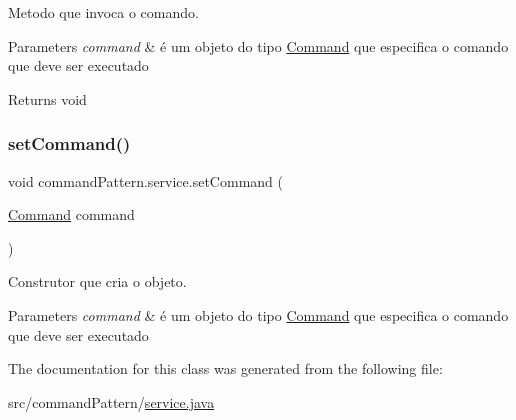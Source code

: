 Metodo que invoca o comando. 


\begin{DoxyParams}{Parameters}
{\em command} & é um objeto do tipo \mbox{\hyperlink{interfacecommand_pattern_1_1_command}{Command}} que especifica o comando que deve ser executado \\
\hline
\end{DoxyParams}
\begin{DoxyReturn}{Returns}
void 
\end{DoxyReturn}
\mbox{\label{classcommand_pattern_1_1service_a126704d575df711cb8abb7e03b7f0ce8}} 
\subsubsection{\texorpdfstring{setCommand()}{setCommand()}}
{\footnotesize\ttfamily void command\+Pattern.\+service.\+set\+Command (\begin{DoxyParamCaption}\item[{\mbox{\hyperlink{interfacecommand_pattern_1_1_command}{Command}}}]{command }\end{DoxyParamCaption})}



Construtor que cria o objeto. 


\begin{DoxyParams}{Parameters}
{\em command} & é um objeto do tipo \mbox{\hyperlink{interfacecommand_pattern_1_1_command}{Command}} que especifica o comando que deve ser executado \\
\hline
\end{DoxyParams}


The documentation for this class was generated from the following file\+:\begin{DoxyCompactItemize}
\item 
src/command\+Pattern/\mbox{\hyperlink{service_8java}{service.\+java}}\end{DoxyCompactItemize}
